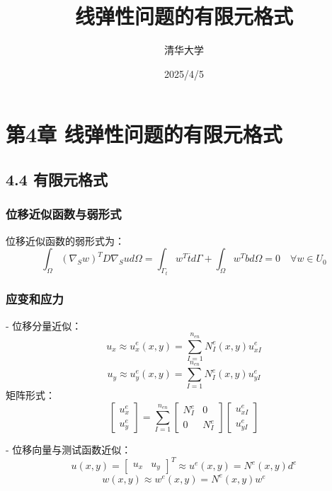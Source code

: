 \documentclass{article}
\title{线弹性问题的有限元格式}
\author{清华大学}
\date{2025/4/5}
\begin{document}
\maketitle

\section{第4章 线弹性问题的有限元格式}
\subsection{4.4 有限元格式}

\subsubsection{位移近似函数与弱形式}
位移近似函数的弱形式为：
\[
\int_{\Omega}\left(\nabla_{S} w\right)^{T} D \nabla_{S} u d \Omega = \int_{\Gamma_{t}} w^{T} \overline{t} d \Gamma + \int_{\Omega} w^{T} b d \Omega = 0 \quad \forall w \in U_{0}
\]

\subsubsection{应变和应力}
- 位移分量近似：
  \[
  u_{x} \approx u_{x}^{e}(x, y) = \sum_{I=1}^{n_{en}} N_{I}^{e}(x, y) u_{x I}^{e}
  \]
  \[
  u_{y} \approx u_{y}^{e}(x, y) = \sum_{I=1}^{n_{en}} N_{I}^{e}(x, y) u_{y I}^{e}
  \]
  矩阵形式：
  \[
  \left[\begin{array}{c}u_{x}^{e} \\ u_{y}^{e}\end{array}\right] = \sum_{I=1}^{n_{en}}\left[\begin{array}{cc}N_{I}^{e} & 0 \\ 0 & N_{I}^{e}\end{array}\right]\left[\begin{array}{l}u_{x I}^{e} \\ u_{y I}^{e}\end{array}\right]
  \]
  
- 位移向量与测试函数近似：
  \[
  u(x, y) = \left[\begin{array}{ll} u_{x} & u_{y} \end{array}\right]^{T} \approx u^{e}(x, y) = N^{e}(x, y) d^{e}
  \]
  \[
  w(x, y) \approx w^{e}(x, y) = N^{e}(x, y) w^{e}
  \]
  
\end{document}
